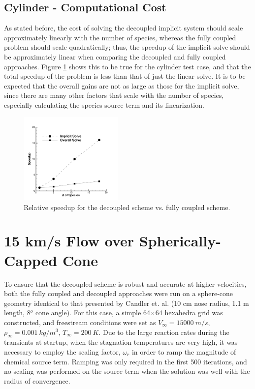 \subsection{Cylinder - Computational Cost}

As stated before, the cost of solving the decoupled implicit system should scale
approximately linearly with the number of species, whereas the fully coupled
problem should scale quadratically; thus, the speedup of the implicit solve
should be approximately linear when comparing the decoupled and fully coupled
approaches.  Figure \ref{rel_speedup} shows this to be true for the cylinder test
case, and that the total speedup of the problem is less than that of just
the linear solve.  It is to be expected that the overall gains are not as large
as those for the implicit solve, since there are many other factors that
scale with the number of species, especially calculating the species source term
and its linearization.

\begin{figure}[h]
  \centering
  \includegraphics[width=0.45\textwidth]{figures/scitech/speedup} 
  \caption{ Relative speedup for the decoupled scheme vs. fully coupled scheme.}
  \label{rel_speedup} 
\end{figure}

\section{15 km/s Flow over Spherically-Capped Cone}
\label{sec:15-kps-sphere-cone}

To ensure that the decoupled scheme is robust and accurate at higher velocities, both the
fully coupled and decoupled approaches were run on a sphere-cone geometry
identical to that presented by Candler et. al. \cite{candler} (10 cm nose
radius, 1.1 m length, 8$^o$ cone angle).  For this case, a simple 64$\times$64
hexahedra grid was constructed, and freestream conditions were set as
$V_{\infty} = 15000\ m/s$, $\rho_{\infty}=0.001\ kg/m^3$, $T_\infty = 200\ K$.
Due to the large reaction rates during the transients at startup, when the
stagnation temperatures are very high, it was necessary to employ the scaling
factor, $\omega_r$ in order to ramp the magnitude of chemical source term.
Ramping was only required in the first 500 iterations, and no scaling was
performed on the source term when the solution was well with the radius of
convergence.


